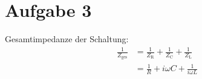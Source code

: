 \documentclass[11pt a4paper]{article}
\begin{document}
\thispagestyle{fancy}
\section*{Aufgabe 3}

Gesamtimpedanze der Schaltung:
\begin{align*}
	\frac1{Z_\text{ges}}
	&= \frac1{Z_\text{R}} + \frac1{Z_\text{C}} + \frac1{Z_\text{L}} \\
	&= \frac1R + i\omega C + \frac1{i\omega L}
\end{align*}
\end{document}

